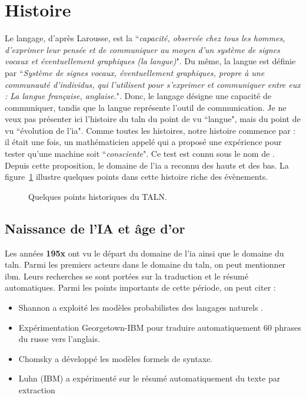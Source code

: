 \documentclass{KodeBook}
\begin{document}
\section{Histoire}

Le langage, d'après Larousse, est la ``\textit{capacité, observée chez tous les hommes, d'exprimer leur pensée et de communiquer au moyen d'un système de signes vocaux et éventuellement graphiques (la langue)}".
Du même, la langue est définie par ``\textit{Système de signes vocaux, éventuellement graphiques, propre à une communauté d'individus, qui l'utilisent pour s'exprimer et communiquer entre eux : La langue française, anglaise.}". 
Donc, le langage désigne une capacité de communiquer, tandis que la langue représente l'outil de communication. 
Je ne veux pas présenter ici l'histoire du \ac{taln} du point de vu ``langue", mais du point de vu ``évolution de l'\ac{ia}".
Comme toutes les histoires, notre histoire commence par : il était une fois, un mathématicien appelé  qui a proposé une expérience pour tester qu'une machine soit ``\textit{consciente}". 
Ce test est connu sous le nom de . 
Depuis cette proposition, le domaine de l'\ac{ia} a reconnu des hauts et des bas.
La figure~\ref{fig:histoire} illustre quelques points dans cette histoire riche des évènements.

\begin{figure}
	\centering
	\caption{Quelques points historiques du TALN. \label{fig:histoire}}
\end{figure}

\subsection{Naissance de l'IA et âge d'or}

Les années \textbf{195x} ont vu le départ du domaine de  l'\ac{ia} ainsi que le domaine du \ac{taln}.
Parmi les premiers acteurs dans le domaine du \ac{taln}, on peut mentionner \ac{ibm}. 
Leurs recherches se sont portées sur la traduction et le résumé automatiques.
Parmi les points importants de cette période, on peut citer :
\begin{itemize}
	\item {} Shannon a exploité les modèles probabilistes des langages naturels \cite{1951-shannon}.
	\item {} Expérimentation Georgetown-IBM pour traduire automatiquement 60 phrases du russe vers l'anglais.
	\item {} Chomsky a développé les modèles formels de syntaxe.
	\item {} Luhn (IBM) a expérimenté sur le résumé automatiquement du texte par extraction \cite{1958-luhn}
\end{itemize}
\end{document}

